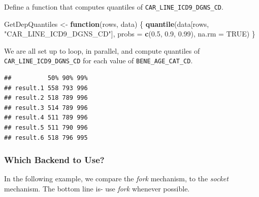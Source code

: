\documentclass[]{book}
\newenvironment{Shaded}{\begin{snugshade}}{\end{snugshade}}
\newcommand{\ControlFlowTok}[1]{\textcolor[rgb]{0.13,0.29,0.53}{\textbf{#1}}}
\newcommand{\DataTypeTok}[1]{\textcolor[rgb]{0.13,0.29,0.53}{#1}}
\newcommand{\FloatTok}[1]{\textcolor[rgb]{0.00,0.00,0.81}{#1}}
\newcommand{\KeywordTok}[1]{\textcolor[rgb]{0.13,0.29,0.53}{\textbf{#1}}}
\newcommand{\NormalTok}[1]{#1}
\newcommand{\OperatorTok}[1]{\textcolor[rgb]{0.81,0.36,0.00}{\textbf{#1}}}
\newcommand{\OtherTok}[1]{\textcolor[rgb]{0.56,0.35,0.01}{#1}}
\newcommand{\StringTok}[1]{\textcolor[rgb]{0.31,0.60,0.02}{#1}}
\theoremstyle{definition}
\theoremstyle{definition}
\theoremstyle{definition}
\theoremstyle{remark}
\begin{document}
Define a function that computes quantiles of \texttt{CAR\_LINE\_ICD9\_DGNS\_CD}.

\begin{Shaded}
\begin{Highlighting}[]
\NormalTok{GetDepQuantiles <-}\StringTok{ }\ControlFlowTok{function}\NormalTok{(rows, data) \{}
 \KeywordTok{quantile}\NormalTok{(data[rows, }\StringTok{"CAR_LINE_ICD9_DGNS_CD"}\NormalTok{], }\DataTypeTok{probs =} \KeywordTok{c}\NormalTok{(}\FloatTok{0.5}\NormalTok{, }\FloatTok{0.9}\NormalTok{, }\FloatTok{0.99}\NormalTok{),}
 \DataTypeTok{na.rm =} \OtherTok{TRUE}\NormalTok{)}
\NormalTok{\}}
\end{Highlighting}
\end{Shaded}

We are all set up to loop, in parallel, and compute quantiles of \texttt{CAR\_LINE\_ICD9\_DGNS\_CD} for each value of \texttt{BENE\_AGE\_CAT\_CD}.

\begin{Shaded}
\end{Shaded}

\begin{verbatim}
##          50% 90% 99%
## result.1 558 793 996
## result.2 518 789 996
## result.3 514 789 996
## result.4 511 789 996
## result.5 511 790 996
## result.6 518 796 995
\end{verbatim}

\hypertarget{which-backend-to-use}{%
\subsubsection{Which Backend to Use?}\label{which-backend-to-use}}

In the following example, we compare the \emph{fork} mechanism, to the \emph{socket} mechanism.
The bottom line is- use \emph{fork} whenever possible.
\end{document}
